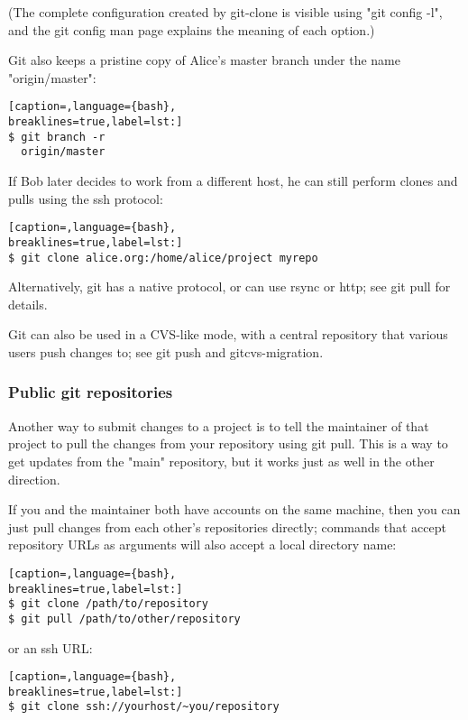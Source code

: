 (The complete configuration created by git-clone is visible using "git config
-l", and the git config man page explains the meaning of each option.)

Git also keeps a pristine copy of Alice's master branch under the name
"origin/master":
\lstset{basicstyle=\scriptsize, numbers=none, captionpos=b, tabsize=4}
\begin{lstlisting}[caption=,language={bash},
breaklines=true,label=lst:]
$ git branch -r
  origin/master
\end{lstlisting}

If Bob later decides to work from a different host, he can still perform clones
and pulls using the ssh protocol:
\lstset{basicstyle=\scriptsize, numbers=none, captionpos=b, tabsize=4}
\begin{lstlisting}[caption=,language={bash},
breaklines=true,label=lst:]
$ git clone alice.org:/home/alice/project myrepo
\end{lstlisting}

Alternatively, git has a native protocol, or can use rsync or http; see git
pull for details.

Git can also be used in a CVS-like mode, with a central repository that various
users push changes to; see git push and gitcvs-migration.

\subsubsection{Public git repositories}

Another way to submit changes to a project is to tell the maintainer of that
project to pull the changes from your repository using git pull. This is a way
to get updates from the "main" repository, but it works just as well in the
other direction.

If you and the maintainer both have accounts on the same machine, then you can
just pull changes from each other's repositories directly; commands that accept
repository URLs as arguments will also accept a local directory name:
\lstset{basicstyle=\scriptsize, numbers=none, captionpos=b, tabsize=4}
\begin{lstlisting}[caption=,language={bash},
breaklines=true,label=lst:]
$ git clone /path/to/repository
$ git pull /path/to/other/repository
\end{lstlisting}

or an ssh URL:
\lstset{basicstyle=\scriptsize, numbers=none, captionpos=b, tabsize=4}
\begin{lstlisting}[caption=,language={bash},
breaklines=true,label=lst:]
$ git clone ssh://yourhost/~you/repository
\end{lstlisting}

